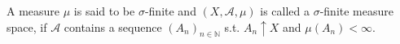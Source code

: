 \begin{definition}
    A measure \(\mu\) is said to be \(\sigma\)-finite and \(\left(X,\mathcal{A},\mu\right)\) is called a \(\sigma\)-finite measure space,
    if \(\mathcal{A}\) contains a sequence \((A_n)_{n\in\mathbb{N}}\) s.t. \(A_n\uparrow X\) and \(\mu(A_n)<\infty\).
\end{definition}